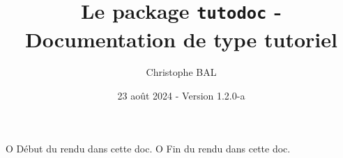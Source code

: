 
\usepackage[lang = french]{tutodoc}







                       { O{ Début du rendu dans cette doc. }
                         O{ Fin du rendu dans cette doc. } }{
        \nopagebreak\smallskip\nopagebreak
}{
        \nopagebreak\smallskip\nopagebreak
}





\title{Le package \texttt{tutodoc} - Documentation de type tutoriel}
\author{Christophe BAL}
\date{23 août 2024 - Version 1.2.0-a}

\maketitle

